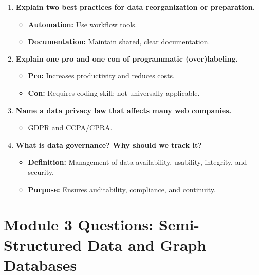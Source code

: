 \documentclass[12pt]{article}
\begin{document}
\begin{enumerate}
    \item \textbf{Explain two best practices for data reorganization or preparation.}
    \begin{itemize}
        \item \textbf{Automation:} Use workflow tools.
        \item \textbf{Documentation:} Maintain shared, clear documentation.
    \end{itemize}

    \item \textbf{Explain one pro and one con of programmatic (over)labeling.}
    \begin{itemize}
        \item \textbf{Pro:} Increases productivity and reduces costs.
        \item \textbf{Con:} Requires coding skill; not universally applicable.
    \end{itemize}

    \item \textbf{Name a data privacy law that affects many web companies.}
    \begin{itemize}
        \item GDPR and CCPA/CPRA.
    \end{itemize}

    \item \textbf{What is data governance? Why should we track it?}
    \begin{itemize}
        \item \textbf{Definition:} Management of data availability, usability, integrity, and security.
        \item \textbf{Purpose:} Ensures auditability, compliance, and continuity.
    \end{itemize}
\end{enumerate}

\section*{Module 3 Questions: Semi-Structured Data and Graph Databases}
\end{document}
